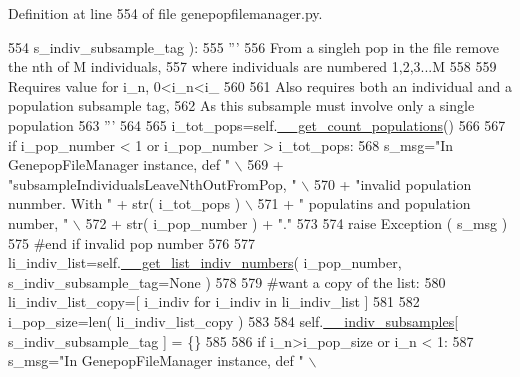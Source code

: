 Definition at line 554 of file genepopfilemanager.\+py.


\begin{DoxyCode}
554                                                     s\_indiv\_subsample\_tag ):
555         \textcolor{stringliteral}{'''}
556 \textcolor{stringliteral}{        From a singleh pop in the file remove the nth of M individuals, }
557 \textcolor{stringliteral}{        where individuals are numbered 1,2,3...M}
558 \textcolor{stringliteral}{}
559 \textcolor{stringliteral}{        Requires value for i\_n, 0<i\_n<i\_}
560 \textcolor{stringliteral}{}
561 \textcolor{stringliteral}{        Also requires both an individual and a population subsample tag,}
562 \textcolor{stringliteral}{        As this subsample must involve only a single population}
563 \textcolor{stringliteral}{        '''}
564     
565         i\_tot\_pops=self.\hyperlink{classnegui_1_1genepopfilemanager_1_1GenepopFileManager_a51f6dcbd17c80f8e61114b11283b655f}{\_\_get\_count\_populations}()
566 
567         \textcolor{keywordflow}{if} i\_pop\_number < 1 \textcolor{keywordflow}{or} i\_pop\_number > i\_tot\_pops:
568             s\_msg=\textcolor{stringliteral}{"In GenepopFileManager instance, def "} \(\backslash\)
569                     + \textcolor{stringliteral}{"subsampleIndividualsLeaveNthOutFromPop, "} \(\backslash\)
570                     + \textcolor{stringliteral}{"invalid population nunmber.  With "} + str( i\_tot\_pops ) \(\backslash\)
571                     + \textcolor{stringliteral}{" populatins and  population number, "} \(\backslash\)
572                     + str( i\_pop\_number ) + \textcolor{stringliteral}{"."}
573 
574             \textcolor{keywordflow}{raise} Exception ( s\_msg )
575         \textcolor{comment}{#end if invalid pop number}
576 
577         li\_indiv\_list=self.\hyperlink{classnegui_1_1genepopfilemanager_1_1GenepopFileManager_a4615769e9db90aa477aa3fd865408f54}{\_\_get\_list\_indiv\_numbers}( i\_pop\_number, 
      s\_indiv\_subsample\_tag=\textcolor{keywordtype}{None} )
578 
579         \textcolor{comment}{#want a copy of the list:}
580         li\_indiv\_list\_copy=[ i\_indiv \textcolor{keywordflow}{for} i\_indiv \textcolor{keywordflow}{in} li\_indiv\_list ]
581 
582         i\_pop\_size=len( li\_indiv\_list\_copy )
583 
584         self.\hyperlink{classnegui_1_1genepopfilemanager_1_1GenepopFileManager_a1e8379bcee4902ca9314ff53fcb71644}{\_\_indiv\_subsamples}[ s\_indiv\_subsample\_tag ] = \{\}
585 
586         \textcolor{keywordflow}{if} i\_n>i\_pop\_size \textcolor{keywordflow}{or} i\_n < 1:
587             s\_msg=\textcolor{stringliteral}{"In GenepopFileManager instance, def "} \(\backslash\)

\end{DoxyCode}

